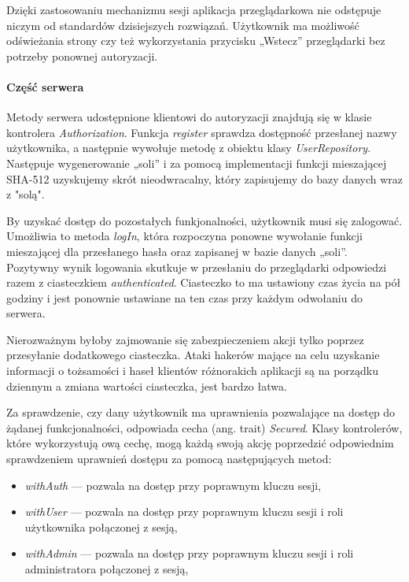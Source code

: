 \documentclass[a4paper,12pt,twoside]{article}
\begin{document}
Dzięki zastosowaniu mechanizmu sesji aplikacja przeglądarkowa nie odstępuje niczym
od standardów dzisiejszych rozwiązań.
Użytkownik ma możliwość odświeżania strony czy też wykorzystania przycisku „Wstecz” przeglądarki bez potrzeby ponownej autoryzacji.

\paragraph{Część serwera}
Metody serwera udostępnione klientowi do autoryzacji
znajdują się w klasie kontrolera \textit{Authorization}.
Funkcja \textit{register}
sprawdza dostępność przesłanej nazwy użytkownika, a następnie wywołuje
metodę z obiektu klasy \textit{UserRepository}.
Następuje wygenerowanie „soli” i za pomocą implementacji funkcji mieszającej
SHA-512 uzyskujemy skrót nieodwracalny, który zapisujemy do bazy danych wraz z "solą".

By uzyskać dostęp do pozostałych funkjonalności, użytkownik musi się zalogować.
Umożliwia to metoda \textit{logIn}, która rozpoczyna ponowne wywołanie
funkcji mieszającej dla przesłanego hasła oraz zapisanej w bazie danych „soli”. Pozytywny wynik logowania skutkuje w przesłaniu do przeglądarki
odpowiedzi razem z ciasteczkiem \textit{authenticated}.
Ciasteczko to ma ustawiony czas życia na pół godziny i jest ponownie
ustawiane na ten czas przy każdym odwołaniu do serwera.

Nierozważnym byłoby zajmowanie się zabezpieczeniem akcji
tylko poprzez przesyłanie dodatkowego ciasteczka.
Ataki hakerów mające na celu uzyskanie informacji o tożsamości i haseł
klientów różnorakich aplikacji są na porządku dziennym a zmiana
wartości ciasteczka, jest bardzo łatwa.

\newpage
Za sprawdzenie, czy dany użytkownik ma uprawnienia pozwalające
na dostęp do żądanej funkcjonalności, odpowiada
cecha (ang. trait) \textit{Secured}.
Klasy kontrolerów, które wykorzystują ową cechę, mogą każdą
swoją akcję poprzedzić odpowiednim sprawdzeniem uprawnień dostępu
za pomocą następujących metod:
\begin{itemize}
\item \textit{withAuth} — pozwala na dostęp przy poprawnym kluczu sesji,
\item \textit{withUser} — pozwala na dostęp przy poprawnym kluczu sesji i roli użytkownika połączonej z sesją,
\item \textit{withAdmin} — pozwala na dostęp przy poprawnym kluczu sesji i roli administratora połączonej z sesją,
\end{itemize}
\end{document}

